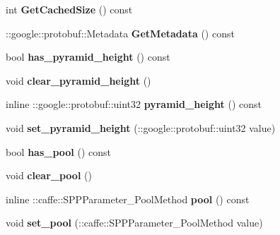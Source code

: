 \begin{DoxyCompactItemize}
int {\bfseries Get\+Cached\+Size} () const
\item 
\mbox{\label{classcaffe_1_1_s_p_p_parameter_ae00565ede1e3b8dd10d1e21f856456bc}} 
\+::google\+::protobuf\+::\+Metadata {\bfseries Get\+Metadata} () const
\item 
\mbox{\label{classcaffe_1_1_s_p_p_parameter_a404c2d060ffb9f48e49bd62e6ca6f856}} 
bool {\bfseries has\+\_\+pyramid\+\_\+height} () const
\item 
\mbox{\label{classcaffe_1_1_s_p_p_parameter_ad5f7652114f6f0c5d34ac4c58462b0e3}} 
void {\bfseries clear\+\_\+pyramid\+\_\+height} ()
\item 
\mbox{\label{classcaffe_1_1_s_p_p_parameter_ad0313d10e75413ae1cec6e86e9839fee}} 
inline \+::google\+::protobuf\+::uint32 {\bfseries pyramid\+\_\+height} () const
\item 
\mbox{\label{classcaffe_1_1_s_p_p_parameter_a3367bad43365879cb2af1f878255900b}} 
void {\bfseries set\+\_\+pyramid\+\_\+height} (\+::google\+::protobuf\+::uint32 value)
\item 
\mbox{\label{classcaffe_1_1_s_p_p_parameter_afa32fa9a2023906d030e7dc2431ce321}} 
bool {\bfseries has\+\_\+pool} () const
\item 
\mbox{\label{classcaffe_1_1_s_p_p_parameter_aaaff062a536f03c62014b5b84b58976d}} 
void {\bfseries clear\+\_\+pool} ()
\item 
\mbox{\label{classcaffe_1_1_s_p_p_parameter_a53b72a4df3a7e42120a03e5530ad1335}} 
inline \+::caffe\+::\+S\+P\+P\+Parameter\+\_\+\+Pool\+Method {\bfseries pool} () const
\item 
\mbox{\label{classcaffe_1_1_s_p_p_parameter_a83f47d9b65ea1c8bea0c45c73c0478aa}} 
void {\bfseries set\+\_\+pool} (\+::caffe\+::\+S\+P\+P\+Parameter\+\_\+\+Pool\+Method value)
\item 
\mbox{\label{classcaffe_1_1_s_p_p_parameter_ad49cdd5326153424e233f2b58027d740}} 

\end{DoxyCompactItemize}
